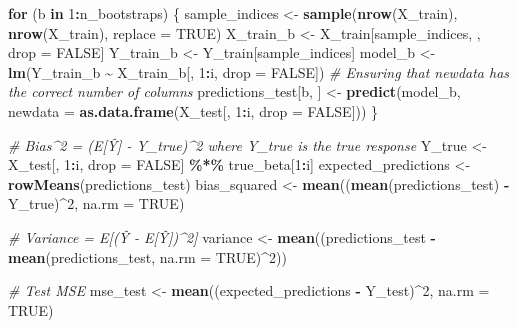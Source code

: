 \documentclass[
]{article}
\newenvironment{Shaded}{\begin{snugshade}}{\end{snugshade}}
\newcommand{\AttributeTok}[1]{\textcolor[rgb]{0.13,0.29,0.53}{#1}}
\newcommand{\CommentTok}[1]{\textcolor[rgb]{0.56,0.35,0.01}{\textit{#1}}}
\newcommand{\ConstantTok}[1]{\textcolor[rgb]{0.56,0.35,0.01}{#1}}
\newcommand{\ControlFlowTok}[1]{\textcolor[rgb]{0.13,0.29,0.53}{\textbf{#1}}}
\newcommand{\DecValTok}[1]{\textcolor[rgb]{0.00,0.00,0.81}{#1}}
\newcommand{\FunctionTok}[1]{\textcolor[rgb]{0.13,0.29,0.53}{\textbf{#1}}}
\newcommand{\NormalTok}[1]{#1}
\newcommand{\OtherTok}[1]{\textcolor[rgb]{0.56,0.35,0.01}{#1}}
\newcommand{\SpecialCharTok}[1]{\textcolor[rgb]{0.81,0.36,0.00}{\textbf{#1}}}
\begin{document}
\begin{Shaded}
\begin{Highlighting}[]
  \ControlFlowTok{for}\NormalTok{ (b }\ControlFlowTok{in} \DecValTok{1}\SpecialCharTok{:}\NormalTok{n\_bootstraps) \{}
\NormalTok{    sample\_indices }\OtherTok{\textless{}{-}} \FunctionTok{sample}\NormalTok{(}\FunctionTok{nrow}\NormalTok{(X\_train), }\FunctionTok{nrow}\NormalTok{(X\_train), }\AttributeTok{replace =} \ConstantTok{TRUE}\NormalTok{)}
\NormalTok{    X\_train\_b }\OtherTok{\textless{}{-}}\NormalTok{ X\_train[sample\_indices, , drop }\OtherTok{=} \ConstantTok{FALSE}\NormalTok{]}
\NormalTok{    Y\_train\_b }\OtherTok{\textless{}{-}}\NormalTok{ Y\_train[sample\_indices]}
\NormalTok{    model\_b }\OtherTok{\textless{}{-}} \FunctionTok{lm}\NormalTok{(Y\_train\_b }\SpecialCharTok{\textasciitilde{}}\NormalTok{ X\_train\_b[, }\DecValTok{1}\SpecialCharTok{:}\NormalTok{i, }\AttributeTok{drop =} \ConstantTok{FALSE}\NormalTok{])}
    \CommentTok{\# Ensuring that newdata has the correct number of columns}
\NormalTok{    predictions\_test[b, ] }\OtherTok{\textless{}{-}} \FunctionTok{predict}\NormalTok{(model\_b, }\AttributeTok{newdata =} \FunctionTok{as.data.frame}\NormalTok{(X\_test[, }\DecValTok{1}\SpecialCharTok{:}\NormalTok{i, }\AttributeTok{drop =} \ConstantTok{FALSE}\NormalTok{]))}
\NormalTok{  \}}
  
  \CommentTok{\# Bias\^{}2 = (E[Ŷ] {-} Y\_true)\^{}2 where Y\_true is the true response}
\NormalTok{  Y\_true }\OtherTok{\textless{}{-}}\NormalTok{ X\_test[, }\DecValTok{1}\SpecialCharTok{:}\NormalTok{i, drop }\OtherTok{=} \ConstantTok{FALSE}\NormalTok{] }\SpecialCharTok{\%*\%}\NormalTok{ true\_beta[}\DecValTok{1}\SpecialCharTok{:}\NormalTok{i]}
\NormalTok{  expected\_predictions }\OtherTok{\textless{}{-}} \FunctionTok{rowMeans}\NormalTok{(predictions\_test)}
\NormalTok{  bias\_squared }\OtherTok{\textless{}{-}} \FunctionTok{mean}\NormalTok{((}\FunctionTok{mean}\NormalTok{(predictions\_test) }\SpecialCharTok{{-}}\NormalTok{ Y\_true)}\SpecialCharTok{\^{}}\DecValTok{2}\NormalTok{, }\AttributeTok{na.rm =} \ConstantTok{TRUE}\NormalTok{)}
  
  \CommentTok{\# Variance = E[(Ŷ {-} E[Ŷ])\^{}2]}
\NormalTok{  variance }\OtherTok{\textless{}{-}} \FunctionTok{mean}\NormalTok{((predictions\_test }\SpecialCharTok{{-}} \FunctionTok{mean}\NormalTok{(predictions\_test, }\AttributeTok{na.rm =} \ConstantTok{TRUE}\NormalTok{)}\SpecialCharTok{\^{}}\DecValTok{2}\NormalTok{))}
  
  \CommentTok{\# Test MSE}
\NormalTok{  mse\_test }\OtherTok{\textless{}{-}} \FunctionTok{mean}\NormalTok{((expected\_predictions }\SpecialCharTok{{-}}\NormalTok{ Y\_test)}\SpecialCharTok{\^{}}\DecValTok{2}\NormalTok{, }\AttributeTok{na.rm =} \ConstantTok{TRUE}\NormalTok{)}
  

\end{Highlighting}
\end{Shaded}
\end{document}

